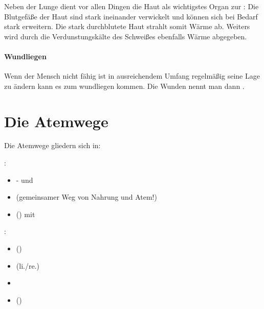 Neben der Lunge dient vor allen Dingen  die Haut als wichtigstes Organ
zur : Die Blutgefäße  der  Haut
sind stark ineinander verwickelt und können sich bei Bedarf stark erweitern. Die
stark durchblutete  Haut strahlt somit Wärme ab. Weiters wird durch
die Verdunstungskälte  des Schweißes  ebenfalls Wärme
abgegeben. 

\paragraph{Wundliegen}
\label{topic:dekubitus}Wenn
der Mensch nicht fähig ist in ausreichendem Umfang regelmäßig seine Lage zu ändern kann es zum wundliegen kommen. Die Wunden nennt man dann
. 


\clearpage
\section{Die Atemwege}

Die Atemwege gliedern sich in: 

\gMarried
{
:

\begin{itemize}
    \item {}- und 
    \item {} (gemeinsamer Weg von Nahrung und
    Atem!)
    \item {} () mit
\end{itemize}

}
{
:
\begin{itemize}
    \item {}
    ()
    \item {} (li./re.)
    \item {}
    \item {}
    ()
\end{itemize}
}

